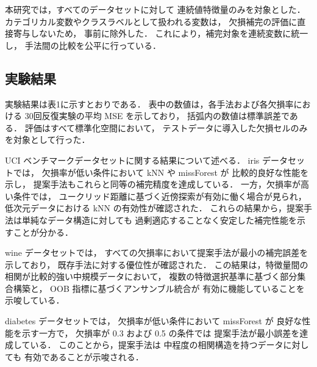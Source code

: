 本研究では，すべてのデータセットに対して
連続値特徴量のみを対象とした．
カテゴリカル変数やクラスラベルとして扱われる変数は，
欠損補完の評価に直接寄与しないため，
事前に除外した．
これにより，補完対象を連続変数に統一し，
手法間の比較を公平に行っている．

\subsection{実験結果}



実験結果は表1に示すとおりである．
表中の数値は，各手法および各欠損率における
30回反復実験の平均 MSE を示しており，
括弧内の数値は標準誤差である．
評価はすべて標準化空間において，
テストデータに導入した欠損セルのみを対象として行った．

UCI ベンチマークデータセットに関する結果について述べる．
iris データセットでは，
欠損率が低い条件において kNN や missForest が
比較的良好な性能を示し，
提案手法もこれらと同等の補完精度を達成している．
一方，欠損率が高い条件では，
ユークリッド距離に基づく近傍探索が有効に働く場合が見られ，
低次元データにおける kNN の有効性が確認された．
これらの結果から，提案手法は単純なデータ構造に対しても
過剰適応することなく安定した補完性能を示すことが分かる．

wine データセットでは，
すべての欠損率において提案手法が最小の補完誤差を示しており，
既存手法に対する優位性が確認された．
この結果は，特徴量間の相関が比較的強い中規模データにおいて，
複数の特徴選択基準に基づく部分集合構築と，
OOB 指標に基づくアンサンブル統合が
有効に機能していることを示唆している．

diabetes データセットでは，
欠損率が低い条件において missForest が
良好な性能を示す一方で，
欠損率が 0.3 および 0.5 の条件では
提案手法が最小誤差を達成している．
このことから，提案手法は
中程度の相関構造を持つデータに対しても
有効であることが示唆される．

